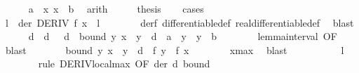 \begin{isabellebody}
\ \ \ \ \isamarkupfalse%
\ {\isacartoucheopen}a\ {\isasymle}\ x{\isacartoucheclose}\ {\isacartoucheopen}x\ {\isasymle}\ b{\isacartoucheclose}\ \isamarkupfalse%
\ arith\isanewline
\ \ \isamarkupfalse%
\ \isamarkupfalse%
\ {\isacharquery}{\kern0pt}thesis\isanewline
\ \ \isamarkupfalse%
\ cases\isanewline
\ \ \ \ \isamarkupfalse%
\ {}\isanewline
\ \ \ \ %
\isanewline
\ \ \ \ \isamarkupfalse%
\ \isamarkupfalse%
\ l\ \ der{\isacharcolon}{\kern0pt}\ {\isachardoublequoteopen}DERIV\ f\ x\ {\isacharcolon}{\kern0pt}{\isachargreater}{\kern0pt}\ l{\isachardoublequoteclose}\isanewline
\ \ \ \ \ \ \isamarkupfalse%
\ derf\ differentiable{\isacharunderscore}{\kern0pt}def\ real{\isacharunderscore}{\kern0pt}differentiable{\isacharunderscore}{\kern0pt}def\ \isamarkupfalse%
\ blast\isanewline
\ \ \ \ \isamarkupfalse%
\ d\ \ d{\isacharcolon}{\kern0pt}\ {\isachardoublequoteopen}{}\ {\isacharless}{\kern0pt}\ d{\isachardoublequoteclose}\ \ bound{\isacharcolon}{\kern0pt}\ {\isachardoublequoteopen}{\isasymforall}y{\isachardot}{\kern0pt}\ {\isasymbar}x\ {\isacharminus}{\kern0pt}\ y{\isasymbar}\ {\isacharless}{\kern0pt}\ d\ {\isasymlongrightarrow}\ a\ {\isasymle}\ y\ {\isasymand}\ y\ {\isasymle}\ b{\isachardoublequoteclose}\isanewline
\ \ \ \ \ \ \isamarkupfalse%
\ lemma{\isacharunderscore}{\kern0pt}interval\ {\isacharbrackleft}{\kern0pt}OF\ {}{\isacharbrackright}{\kern0pt}\ \isamarkupfalse%
\ blast\isanewline
\ \ \ \ \isamarkupfalse%
\ \isamarkupfalse%
\ bound{\isacharprime}{\kern0pt}{\isacharcolon}{\kern0pt}\ {\isachardoublequoteopen}{\isasymforall}y{\isachardot}{\kern0pt}\ {\isasymbar}x\ {\isacharminus}{\kern0pt}\ y{\isasymbar}\ {\isacharless}{\kern0pt}\ d\ {\isasymlongrightarrow}\ f\ y\ {\isasymle}\ f\ x{\isachardoublequoteclose}\isanewline
\ \ \ \ \ \ \isamarkupfalse%
\ x{\isacharunderscore}{\kern0pt}max\ \isamarkupfalse%
\ blast\isanewline
\ \ \ \ %
\isanewline
\ \ \ \ \isamarkupfalse%
\ {\isachardoublequoteopen}l\ {\isacharequal}{\kern0pt}\ {}{\isachardoublequoteclose}\isanewline
\ \ \ \ \ \ \isamarkupfalse%
\ {\isacharparenleft}{\kern0pt}rule\ DERIV{\isacharunderscore}{\kern0pt}local{\isacharunderscore}{\kern0pt}max\ {\isacharbrackleft}{\kern0pt}OF\ der\ d\ bound{\isacharprime}{\kern0pt}{\isacharbrackright}{\kern0pt}{\isacharparenright}{\kern0pt}\isanewline

\end{isabellebody}
